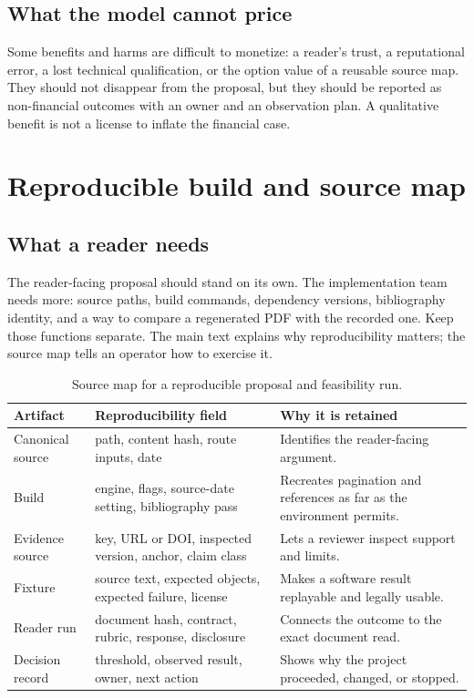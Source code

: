 \subsection{What the model cannot price}

Some benefits and harms are difficult to monetize: a reader's trust, a
reputational error, a lost technical qualification, or the option value of a
reusable source map. They should not disappear from the proposal, but they
should be reported as non-financial outcomes with an owner and an observation
plan. A qualitative benefit is not a license to inflate the financial case.

\section{Reproducible build and source map}
\label{app:reproducibility}

\subsection{What a reader needs}

The reader-facing proposal should stand on its own. The implementation team
needs more: source paths, build commands, dependency versions, bibliography
identity, and a way to compare a regenerated PDF with the recorded one. Keep
those functions separate. The main text explains why reproducibility matters;
the source map tells an operator how to exercise it.

\begin{table}[H]
\centering
\small
\begin{tabularx}{\textwidth}{@{}p{}p{}L@{}}
\toprule
Artifact & Reproducibility field & Why it is retained \\
\midrule
Canonical source & path, content hash, route inputs, date & Identifies the
reader-facing argument. \\
Build & engine, flags, source-date setting, bibliography pass & Recreates
pagination and references as far as the environment permits. \\
Evidence source & key, URL or DOI, inspected version, anchor, claim class &
Lets a reviewer inspect support and limits. \\
Fixture & source text, expected objects, expected failure, license & Makes a
software result replayable and legally usable. \\
Reader run & document hash, contract, rubric, response, disclosure & Connects
the outcome to the exact document read. \\
Decision record & threshold, observed result, owner, next action & Shows why
the project proceeded, changed, or stopped. \\
\bottomrule
\end{tabularx}
\caption{Source map for a reproducible proposal and feasibility run.}
\label{tab:source-map}
\end{table}

